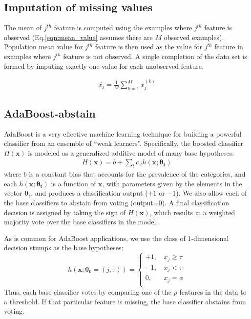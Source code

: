 \documentclass[
   technote
]{phildoc}
\newcommand{\eq}{Eq.}
\begin{document}
\subsection{Imputation of missing values}
The mean of $j^{th}$ feature is computed using the examples where $j^{th}$ feature  is observed (\eq{}\ref{eqn:mean_value} assumes there are $M$ observed examples). Population mean value for $j^{th}$ feature is then used as the value for $j^{th}$ feature in examples where $j^{th}$ feature is not observed. A single completion of the data set is formed by imputing exactly one value for each unobserved feature. 

\begin{eqnarray}
\label{eqn:mean_value}
\bar{x_{j}} = \frac{1}{M}\sum_{k=1}^M x_{j}^{(k)}
\end{eqnarray}  



\subsection{AdaBoost-abstain}
\label{sec:adaboost}
AdaBoost \cite{Schapire:1999} is a very effective machine learning technique for building a powerful classifier from an ensemble of ``weak learners''.  Specifically, the boosted classifier $H(\bm{x})$ is modeled as a generalized additive model of many base hypotheses:
\begin{eqnarray}
H(\bm{x}) = b + \sum_{t} \alpha_t h(\bm{x}; \bm{\theta_t})
\label{eqn:additive}
\end{eqnarray}
where $b$ is a constant bias that accounts for the prevalence of the categories, and each $h(\bm{x};\bm{\theta_t})$ is a function of $\bm{x}$, with parameters given by the elements in the vector $\bm{\theta_t}$, and produces a classification output ($+1$ or $-1$).  We also allow each of the base classifiers to abstain from voting (output=$0$).  A final classification decision is assigned by taking the sign of $H(\bm{x})$, which results in a weighted majority vote over the base classifiers in the model.

As is common for AdaBoost applications, we use the class of 1-dimensional decision stumps as the base hypotheses:
\begin{equation}
h(\bm{x}; \bm{\theta_t}=(j,\tau)) = \left\{\begin{array}{rl} +1\text{, } & x_j \geq \tau \\ -1\text{, } & x_j < \tau \\ 0\text{, } & x_j = \phi \\ \end{array}\right.
\end{equation}
Thus, each base classifier votes by comparing one of the $p$ features in the data to a threshold.  If that particular feature is missing, the base classifier abstains from voting.
\end{document}

